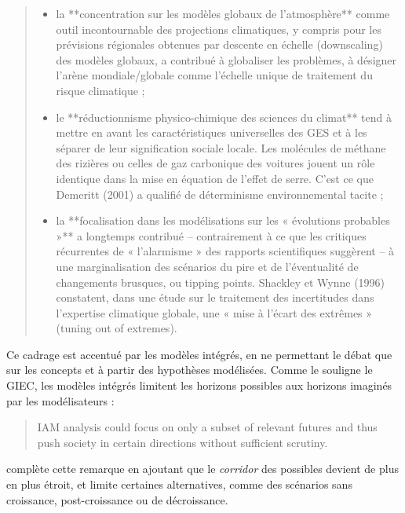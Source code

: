 \begin{quote}
\begin{itemize}
    \item la **concentration sur les modèles globaux de l’atmosphère** comme outil incontournable des projections climatiques, y compris pour les prévisions régionales obtenues par descente en échelle (downscaling) des modèles globaux, a contribué à globaliser les problèmes, à désigner l’arène mondiale/globale comme l’échelle unique de traitement du risque climatique ;
	\item le **réductionnisme physico-chimique des sciences du climat** tend à mettre en avant les caractéristiques universelles des GES et à les séparer de leur signification sociale locale. Les molécules de méthane des rizières ou celles de gaz carbonique des voitures jouent un rôle identique dans la mise en équation de l’effet de serre. C’est ce que Demeritt (2001) a qualifié de déterminisme environnemental tacite ;
	\item la **focalisation dans les modélisations sur les « évolutions probables »** a longtemps contribué – contrairement à ce que les critiques récurrentes de « l’alarmisme » des rapports scientifiques suggèrent – à une marginalisation des scénarios du pire et de l’éventualité de changements brusques, ou tipping points. Shackley et Wynne (1996) constatent, dans une étude sur le traitement des incertitudes dans l’expertise climatique globale, une « mise à l’écart des extrêmes » (tuning out of extremes).
\end{itemize}
\end{quote}

Ce cadrage est accentué par les modèles intégrés, en ne permettant le débat que sur les concepts et à partir des hypothèses modélisées. Comme le souligne le GIEC, les modèles intégrés limitent les horizons possibles aux horizons imaginés par les modélisateurs : 

\begin{quote}
    IAM analysis could focus on only a subset of relevant futures and thus push society in certain directions without sufficient scrutiny. \cite{intergovernmental_panel_on_climate_change_ipcc_annex_2023}
\end{quote}

\cite{cointe_ar6_2024} complète cette remarque en ajoutant que le \emph{corridor} des possibles devient de plus en plus étroit, et limite certaines alternatives, comme des scénarios sans croissance, post-croissance ou de décroissance. 

